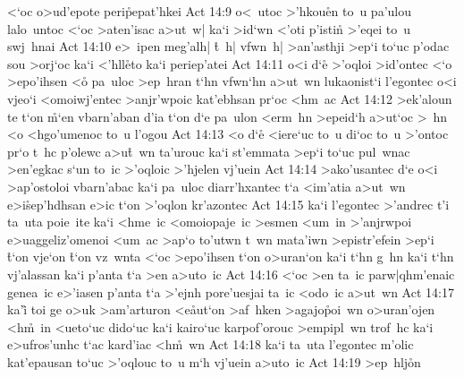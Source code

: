 <`oc
o>ud'epote
peri\r{p}epat'hkei\bibvsend
{}
\vs Act 14:9
o<~utoc
>'hkou\r{e}n
to~u
pa'ulou
lalo~untoc
<`oc
>aten'isac
a>ut~w|
ka`i
>id`wn
<'oti
p'istin\r{}
>'eqei
to~u
swj~hnai\bibvsend
\vs Act 14:10
e>~ipen
meg'alh|
\r{t}~h|
vfwn~h|
>an'asthji
>ep`i
to`uc
p'odac
sou
>orj`oc
ka`i
<'hll\r{e}to
ka`i
periep'atei\bibvsend
\vs Act 14:11
o<i
d`e\r{}
>'oqloi
>id'ontec
<`o
>epo'ihsen
<o\r{}
pa~uloc
>ep~hran
t`hn
vfwn`hn
a>ut~wn
lukaonist`i
l'egontec
o<i
vjeo`i
<omoiwj'entec
>anjr'wpoic
kat'ebhsan
pr`oc
<hm~ac\bibvsend
\vs Act 14:12
>ek'aloun
te
t`on
\r{m}`en
vbarn'aban
d'ia
t`on
d`e
pa~ulon
<erm~hn
>epeid`h
a>ut`oc
>~hn
<o
<hgo'umenoc
to~u
l'ogou\bibvsend
\vs Act 14:13
<o
d`e\r{}
<iere`uc
to~u
di`oc
to~u
>'ontoc
pr`o
t~hc
p'olewc
a>u\r{t}~wn
ta'urouc
ka`i
st'emmata
>ep`i
to`uc
pul~wnac
>en'egkac
s`un
to~ic
>'oqloic
>'hjelen
vj'uein\bibvsend
\vs Act 14:14
>ako'usantec
d`e
o<i
>ap'ostoloi
vbarn'abac
ka`i
pa~uloc
diarr'hxantec
t`a
<im'atia
a>ut~wn
e>i\r{s}ep'hdhsan
e>ic
t`on
>'oqlon
kr'azontec\bibvsend
\vs Act 14:15
ka`i
l'egontec
>'andrec
t'i
ta~uta
poie~ite
ka`i
<hme~ic
<omoiopaje~ic
>esmen
<um~in
>'anjrwpoi
e>uaggeliz'omenoi
<um~ac
>ap`o
to'utwn
t~wn
mata'iwn
>epistr'efein
>ep`i
\r{t}`on
vje`on
\r{t}`on
vz~wnta
<`oc
>epo'ihsen
t`on
o>uran`on
ka`i
t`hn
g~hn
ka`i
t`hn
vj'alassan
ka`i
p'anta
t`a
>en
a>uto~ic\bibvsend
\vs Act 14:16
<`oc
>en
ta~ic
parw|qhm'enaic
genea~ic
e>'iasen
p'anta
t`a
>'ejnh
pore'uesjai
ta~ic
<odo~ic
a>ut~wn\bibvsend
\vs Act 14:17
ka'i\r{}
toi
ge
o>uk
>am'arturon
<e\r{a}ut`on
>af~hken
>agajo\r{p}oi~wn
o>uran'ojen
<h\r{m}~in
<ueto`uc
dido`uc
ka`i
kairo`uc
karpof'orouc
>empipl~wn
trof~hc
ka`i
e>ufros'unhc
t`ac
kard'iac
<h\r{m}~wn\bibvsend
{}
\vs Act 14:18
ka`i
ta~uta
l'egontec
m'olic
kat'epausan
to`uc
>'oqlouc
to~u
m`h
vj'uein
a>uto~ic\bibvsend
\vs Act 14:19
>ep~hlj\r{o}n
